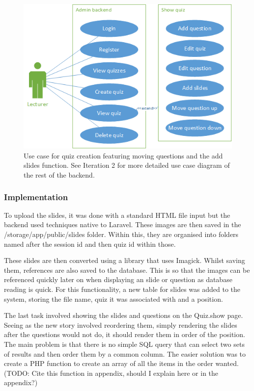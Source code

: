 \begin{figure}
	\caption{Use case for quiz creation featuring moving questions and the add slides function. See Iteration 2 for more detailed use case diagram of the rest of the backend.}
	\centerline{\includegraphics{Chapter2/Iter-7/iter-7-use-case}}
	\label{fig:iter-7-use-case}
\end{figure}

\subsubsection{Implementation}
To upload the slides, it was done with a standard HTML file input but the backend used techniques native to Laravel\cite{laravel-saving-files}. These images are then saved in the /storage/app/public/slides folder. Within this, they are organised into folders named after the session id and then quiz id within those.

These slides are then converted using a library that uses Imagick\cite{spatie-pdf-converter}. Whilst saving them, references are also saved to the database. This is so that the images can be referenced quickly later on when displaying an slide or question as database reading is quick. For this functionality, a new table for slides was added to the system, storing the file name, quiz it was associated with and a position. 

The last task involved showing the slides and questions on the Quiz.show page. Seeing as the new story involved reordering them, simply rendering the slides after the questions would not do, it should render them in order of the position. The main problem is that there is no simple SQL query that can select two sets of results and then order them by a common column. The easier solution was to create a PHP function to create an array of all the items in the order wanted. (TODO: Cite this function in appendix, should I explain here or in the appendix?)
